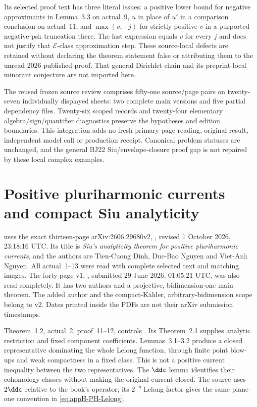 Its selected proof text has three literal issues: a positive lower bound
for negative approximants in Lemma~3.3 on actual~9, $u$ in place of
$u'$ in a comparison conclusion on actual~11, and $\max(v,-j)$
for strictly positive $v$ in a purported negative-psh truncation there.
The last expression equals $v$ for every $j$ and does not justify that
$\mathcal E$-class approximation step. These source-local defects
are retained without declaring the theorem statement false or attributing
them to the unread 2026 published proof. That general Dirichlet chain
and its preprint-local minorant conjecture are not imported here.

The reused frozen source review comprises fifty-one source/page pairs
on twenty-seven individually displayed sheets: two complete main
versions and five partial dependency files. Twenty-six scoped records
and twenty-four elementary algebra/sign/quantifier diagnostics preserve
the hypotheses and edition boundaries. This integration adds no fresh
primary-page reading, original result, independent model call or
production receipt. Canonical problem statuses are unchanged, and the
general BJ22 Siu/envelope-closure proof gap is not repaired by these
local complex examples.

\section{Positive pluriharmonic currents and compact Siu analyticity}
\label{sec:provenance-pluriharmonic-Siu}

 uses the exact thirteen-page
arXiv:2606.29680v2, \cite{DinhNguyenNguyen26SiuV2}, revised
1 October 2026, 23:18:16 UTC. Its title is \emph{Siu's analyticity
theorem for positive pluriharmonic currents}, and the authors are
Tien-Cuong Dinh, Duc-Bao Nguyen and Viet-Anh Nguyen. All actual~1--13
were read with complete selected text and matching images. The forty-page
v1, \cite{DinhNguyen26SiuV1}, submitted 29 June 2026, 01:05:21 UTC,
was also read completely. It has two authors and a projective,
bidimension-one main theorem. The added author and the compact-K\"ahler,
arbitrary-bidimension scope belong to v2. Dates printed inside the PDFs
are not their arXiv submission timestamps.

Theorem~1.2, actual~2, proof~11--12, controls
. Its Theorem~2.1 supplies analytic
restriction and fixed component coefficients. Lemmas~3.1--3.2 produce
a closed representative dominating the whole Lelong function, through
finite point blow-ups and weak compactness in a fixed class. This is
not a positive current inequality between the two representatives.
The $\ddc$ lemma identifies their cohomology classes without making
the original current closed. The source uses $2\ddc$ relative to the
book's operator; its $2^{-q}$ Lelong factor gives the same plane-one
convention in \eqref{eq:appH-PH-Lelong}.

